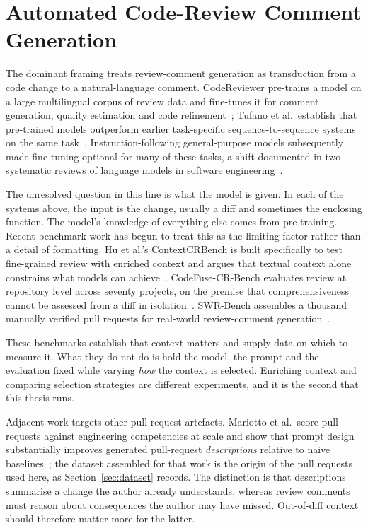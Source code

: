 \section{Automated Code-Review Comment Generation}
\label{sec:sota-generation}

The dominant framing treats review-comment generation as transduction from a code
change to a natural-language comment. CodeReviewer pre-trains a model on a large
multilingual corpus of review data and fine-tunes it for comment generation,
quality estimation and code refinement~\cite{li2022codereviewer}; Tufano et al.\
establish that pre-trained models outperform earlier task-specific
sequence-to-sequence systems on the same
task~\cite{tufano2022codereview}. Instruction-following general-purpose models
subsequently made fine-tuning optional for many of these tasks, a shift documented
in two systematic reviews of language models in software
engineering~\cite{hou2023llmse,fan2023llmse}.

The unresolved question in this line is what the model is given. In each of the
systems above, the input is the change, usually a diff and sometimes the
enclosing function. The model's knowledge of everything else comes from
pre-training. Recent benchmark work has begun to treat this as the limiting
factor rather than a detail of formatting. Hu et al.'s ContextCRBench is built
specifically to test fine-grained review with enriched context and argues that
textual context alone constrains what models can
achieve~\cite{hu2025contextcrbench}. CodeFuse-CR-Bench evaluates review at
repository level across seventy projects, on the premise that comprehensiveness
cannot be assessed from a diff in
isolation~\cite{guo2025codefusecrbench}. SWR-Bench assembles a thousand manually
verified pull requests for real-world review-comment
generation~\cite{zeng2025swrbench}.

These benchmarks establish that context matters and supply data on which to
measure it. What they do not do is hold the model, the prompt and the evaluation
fixed while varying \emph{how} the context is selected. Enriching context and
comparing selection strategies are different experiments, and it is the second that
this thesis runs.

Adjacent work targets other pull-request artefacts. Mariotto et al.\ score pull
requests against engineering competencies at scale and show that prompt design
substantially improves generated pull-request \emph{descriptions} relative to naive
baselines~\cite{mariotto2025esem,mariotto2025}; the dataset assembled for that work
is the origin of the pull requests used here, as
Section~\ref{sec:dataset} records. The distinction is that descriptions summarise a
change the author already understands, whereas review comments must reason about
consequences the author may have missed. Out-of-diff context should therefore
matter more for the latter.
